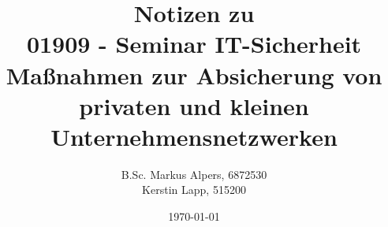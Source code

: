 \documentclass[11pt, a4paper, twoside]{book}
\begin{document}
	
	
	\title{Notizen zu \\ 01909 - Seminar IT-Sicherheit \\ Maßnahmen zur Absicherung von privaten und kleinen Unternehmensnetzwerken}
	\author{B.Sc. Markus Alpers, 6872530 \\ Kerstin Lapp, 515200}
	\date{\today}
	
	\maketitle
	
	
	\tableofcontents
	
	
	
	
	
	
	
	
	
	
	
	
	
	
	
	\renewcommand{\indexname}{Stichwortverzeichnis}		%
	\printindex
	
\end{document}
